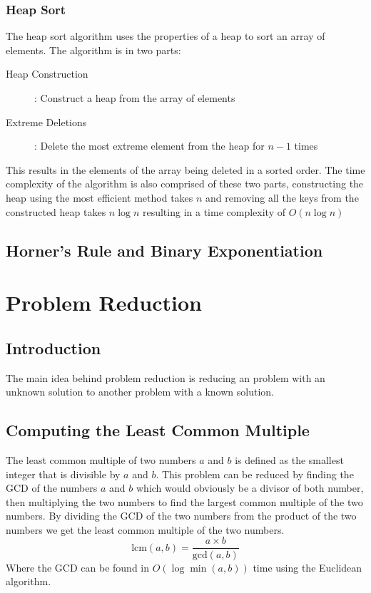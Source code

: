 \documentclass[12pt letter]{report}
\begin{document}
\subsection{Heap Sort}
The heap sort algorithm uses the properties of a heap to sort an array of elements. The algorithm is in two parts:
\begin{description}
  \item[Heap Construction]: Construct a heap from the array of elements
  \item[Extreme Deletions]: Delete the most extreme element from the heap for $n - 1$ times
\end{description}
This results in the elements of the array being deleted in a sorted order. The time complexity of the algorithm is also
comprised of these two parts, constructing the heap using the most efficient method takes $n$ and removing all the keys
from the constructed heap takes $n \log n$ resulting in a time complexity of $O(n \log n)$

\section{Horner's Rule and Binary Exponentiation}


\chapter{Problem Reduction}

\section{Introduction}
The main idea behind problem reduction is reducing an problem with an unknown solution to another problem with a known
solution.

\section{Computing the Least Common Multiple}

The least common multiple of two numbers $a$ and $b$ is defined as the smallest integer that is divisible by $a$ and
$b$. This problem can be reduced by finding the GCD of the numbers $a$ and $b$ which would obviously be a divisor of
both number, then multiplying the two numbers to find the largest common multiple of the two numbers. By dividing the
GCD of the two numbers from the product of the two numbers we get the least common multiple of the two numbers.
\[
  \text{lcm} \left( a, b \right) = \frac{a \times b}{ \text{gcd} \left( a, b \right) }
\]
Where the GCD can be found in $O(\log \min \left( a, b \right) )$ time using the Euclidean algorithm.
\end{document}

